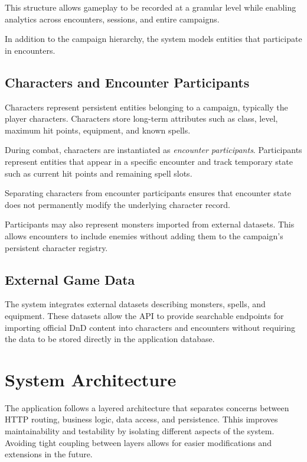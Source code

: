 \documentclass[11pt]{article}
\begin{document}
This structure allows gameplay to be recorded at a granular level while
enabling analytics across encounters, sessions, and entire campaigns.

In addition to the campaign hierarchy, the system models entities that
participate in encounters.

\subsection{Characters and Encounter Participants}

Characters represent persistent entities belonging to a campaign, typically
the player characters. Characters store long-term attributes such as class,
level, maximum hit points, equipment, and known spells.

During combat, characters are instantiated as \textit{encounter participants}.
Participants represent entities that appear in a specific encounter and
track temporary state such as current hit points and remaining spell slots.

Separating characters from encounter participants ensures that encounter
state does not permanently modify the underlying character record.

Participants may also represent monsters imported from external datasets.
This allows encounters to include enemies without adding them to the
campaign's persistent character registry.

\subsection{External Game Data}

The system integrates external datasets describing monsters, spells, and
equipment. These datasets allow the API to provide searchable endpoints
for importing official DnD content into characters and encounters without
requiring the data to be stored directly in the application database.
\section{System Architecture}

The application follows a layered architecture that separates concerns between HTTP routing, business logic, data access, and persistence. Thhis 
improves maintainability and testability by isolating different aspects of the system. Avoiding tight coupling between layers allows for easier modifications and extensions in the future.
\end{document}
